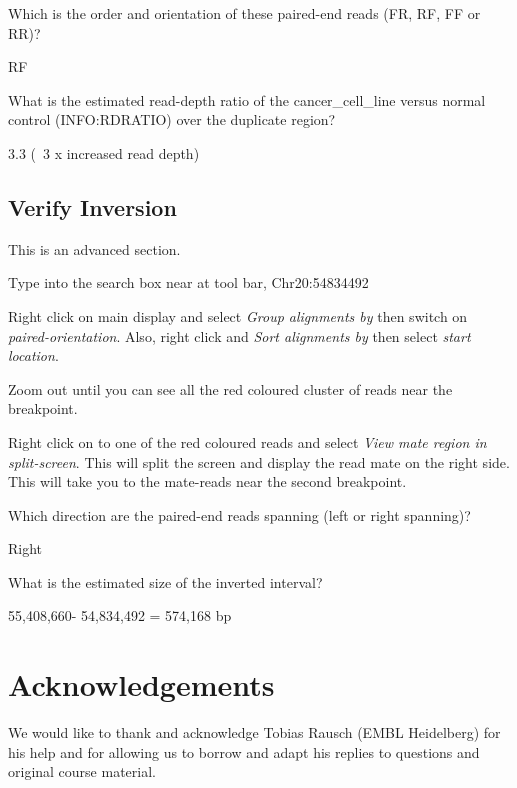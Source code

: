 \begin{questions}
Which is the order and orientation of these paired-end reads (FR, RF, FF or RR)? \newline
\begin{answer}
RF
\end{answer}
\end{questions}
\begin{questions}
What is the estimated read-depth ratio of the cancer\_cell\_line versus normal control (INFO:RDRATIO) over the duplicate region? \newline
\begin{answer}
3.3 (~3 x increased read depth) 
\end{answer}
\end{questions}


\subsection{Verify Inversion}
\begin{advanced}
This is an advanced section.
\begin{steps}

Type into the search box near at tool bar, Chr20:54834492 

Right click on main display and select \emph{Group alignments by} then switch on \emph{paired-orientation}. Also, right click and \emph{Sort alignments by} then select \emph{start location}. 

Zoom out until you can see all the red coloured cluster of reads near the breakpoint. 

Right click on to one of the red coloured reads and select \emph{View mate region in split-screen}. This will split the screen and display the read mate on the right side. This will take you to the mate-reads near the second breakpoint. 
\end{steps}
\end{advanced}


\begin{questions}
Which direction are the paired-end reads spanning (left or right spanning)?  
\begin{answer}
Right
\end{answer}
\end{questions}
\begin{questions}
What is the estimated size of the inverted interval? 
\begin{answer}
55,408,660- 54,834,492 = 574,168 bp
\end{answer}
\end{questions}

\section{Acknowledgements}

We would like to thank and acknowledge Tobias Rausch (EMBL Heidelberg) for his help and for allowing us to borrow and adapt his replies to questions and original course material. 

